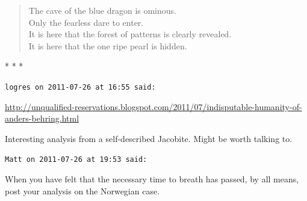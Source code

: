 \begin{verse}
The cave of the blue dragon is ominous.\\
Only the fearless dare to enter.\\
It is here that the forest of patterns is clearly revealed.\\
It is here that the one ripe pearl is hidden.
\end{verse}


\begin{center}* * *\end{center}

\begin{footnotesize}
\begin{sffamily}
\texttt{logres on 2011-07-26 at 16:55 said:}

\url{http://unqualified-reservations.blogspot.com/2011/07/indisputable-humanity-of-anders-behring.html}


Interesting analysis from a self-described Jacobite. Might be worth talking to.

\hfill

\texttt{Matt on 2011-07-26 at 19:53 said:}

When you have felt that the necessary time to breath has passed, by all means, post your analysis on the Norwegian case.


\hfill

\end{sffamily}
\end{footnotesize}

